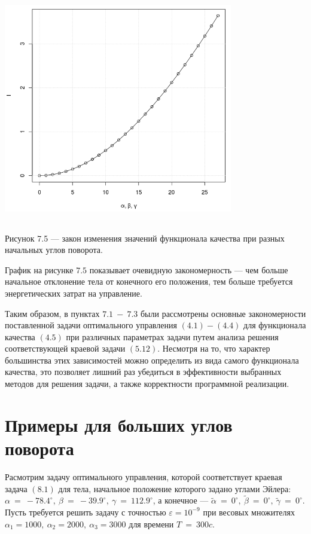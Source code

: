 \documentclass[14pt]{extreport}
\begin{document}
\begin{center}
\includegraphics[width=10cm, height=10cm]{va.png}

Рисунок 7.5 --- закон изменения значений функционала качества при разных начальных углов поворота. 
\end{center}

График на рисунке $7.5$ показывает очевидную закономерность --- чем больше начальное отклонение тела от конечного его положения,
тем больше требуется энергетических затрат на управление.

Таким образом, в пунктах $7.1\ -\ 7.3$ были рассмотрены основные закономерности поставленной задачи оптимального управления $(4.1) - (4.4)$
для функционала качества $(4.5)$ при различных параметрах задачи путем анализа решения соответствующей краевой задачи $(5.12)$. Несмотря на то, что характер большинства этих зависимостей
можно определить из вида самого функционала качества, это позволяет лишний раз убедиться в эффективности выбранных методов для решения задачи,
а также корректности программной реализации. 

\newpage
\chapter{Примеры для больших углов поворота}

Расмотрим задачу оптимального управления, которой соответствует краевая задача $(8.1)$ для тела, начальное положение которого задано углами Эйлера:
$\alpha\ =\ -78.4^{\circ},\ \beta\ =\ -39.9^{\circ},\ \gamma\ =\ 112.9^{\circ}$,
а конечное --- $\widetilde\alpha\ =\ 0^{\circ},\ \widetilde\beta\ =\ 0^{\circ},\ \widetilde\gamma\ =\ 0^{\circ}$. 
Пусть требуется решить задачу с точностью $\varepsilon = 10^{-9}$ при весовых множителях $\alpha_1 = 1000,\ \alpha_2 = 2000,\ \alpha_3 = 3000$ для времени
$T\ =\ 300 c$.
\end{document}
